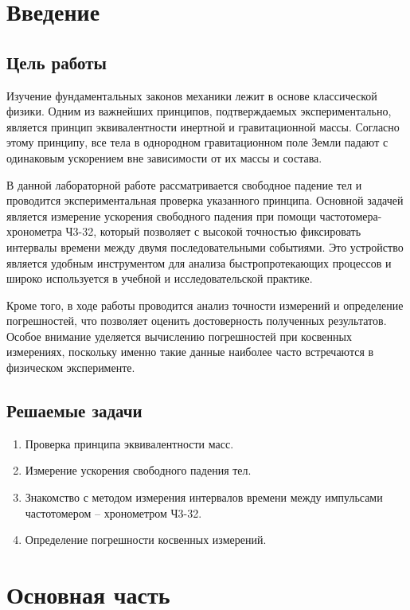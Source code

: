 \section{Введение}

\subsection{Цель работы}

Изучение фундаментальных законов механики лежит в основе классической физики. Одним из важнейших принципов, подтверждаемых экспериментально, является принцип эквивалентности инертной и гравитационной массы. Согласно этому принципу, все тела в однородном гравитационном поле Земли падают с одинаковым ускорением вне зависимости от их массы и состава.

В данной лабораторной работе рассматривается свободное падение тел и проводится экспериментальная проверка указанного принципа. Основной задачей является измерение ускорения свободного падения при помощи частотомера-хронометра Ч3-32, который позволяет с высокой точностью фиксировать интервалы времени между двумя последовательными событиями. Это устройство является удобным инструментом для анализа быстропротекающих процессов и широко используется в учебной и исследовательской практике.

Кроме того, в ходе работы проводится анализ точности измерений и определение погрешностей, что позволяет оценить достоверность полученных результатов. Особое внимание уделяется вычислению погрешностей при косвенных измерениях, поскольку именно такие данные наиболее часто встречаются в физическом эксперименте.


\subsection{Решаемые задачи}
\begin{enumerate}
    \item Проверка принципа эквивалентности масс.
    \item Измерение ускорения свободного падения тел.
    \item Знакомство с методом измерения интервалов времени между импульсами частотомером – хронометром Ч3-32.
    \item Определение погрешности косвенных измерений.
\end{enumerate}

\section{Основная часть}

